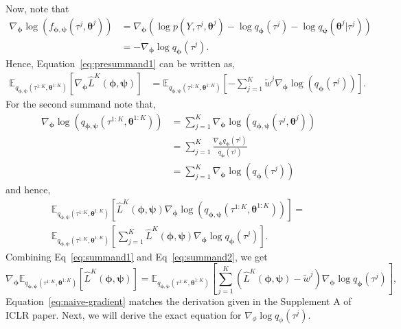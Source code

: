 \documentclass{article}
\newcommand{\bParam}{\bm{\theta}}
\newcommand{\E}{\mathbb{E}}
\begin{document}
Now, note that
\begin{align*}
    \nabla_{\bm{\phi}} \log(f_{\bm{\phi}, \bm{\psi}}(\tau^j, \bParam^j)) &= \nabla_{\bm{\phi}} (\log p(Y, \tau^j, \bParam^j) - \log q_{\bm{\phi}}(\tau^j) - \log q_{\bm{\psi}}(\bParam^j | \tau^j)) \\
    &= - \nabla_{\bm{\phi}} \log q_{\bm{\phi}}(\tau^j).
\end{align*}
Hence, Equation~\ref{eq:presummand1} can be written as,
\begin{align}\label{eq:summand1}
    \E_{q_{\bm{\phi}, \bm{\psi}}(\tau^{1:K}, \bParam^{1:K})}[\nabla_{\bm{\phi}} \hat{L}^K(\bm{\phi}, \bm{\psi})] &= \E_{q_{\bm{\phi}, \bm{\psi}}(\tau^{1:K}, \bParam^{1:K})}\left[- \sum_{j=1}^{K} \tilde{w}^j \nabla_{\bm{\phi}} \log(q_{\bm{\phi}}(\tau^j))\right].
\end{align}
For the second summand note that,
\begin{align*}
    \nabla_{\bm{\phi}} \log(q_{\bm{\phi}, \bm{\psi}}(\tau^{1:K}, \bParam^{1:K})) &= \sum\limits_{j=1}^{K} \nabla_{\bm{\phi}} \log(q_{\bm{\phi},\bm{\psi}}(\tau^{j}, \bParam^{j})) \\
    &= \sum\limits_{j=1}^{K} \frac{\nabla_{\bm{\phi}} q_{\bm{\phi}}(\tau^{j})}{q_{\bm{\phi}}(\tau^{j})} \\
    &= \sum\limits_{j=1}^{K} \nabla_{\bm{\phi}} \log(q_{\bm{\phi}}(\tau^{j}))
\end{align*}
and hence,
\begin{multline}\label{eq:summand2}
    \E_{q_{\bm{\phi}, \bm{\psi}}(\tau^{1:K}, \bParam^{1:K})}[\hat{L}^K(\bm{\phi}, \bm{\psi}) \nabla_{\bm{\phi}} \log(q_{\bm{\phi}, \bm{\psi}}(\tau^{1:K}, \bParam^{1:K}))] = \\
    \E_{q_{\bm{\phi}, \bm{\psi}}(\tau^{1:K},\bParam^{1:K})}\left[\sum\limits_{j=1}^{K} \hat{L}^K(\bm{\phi}, \bm{\psi}) \nabla_{\bm{\phi}} \log q_{\bm{\phi}}(\tau^{j})\right].
\end{multline}
Combining Eq~\ref{eq:summand1} and Eq~\ref{eq:summand2}, we get
\begin{equation}\label{eq:naive-gradient}
    \nabla_{\bm{\phi}} \E_{q_{\bm{\phi}, \bm{\psi}}(\tau^{1:K},\bParam^{1:K})}[\hat{L}^K(\bm{\phi}, \bm{\psi})] = \E_{q_{\bm{\phi}, \bm{\psi}}(\tau^{1:K},\bParam^{1:K})}\left[\sum\limits_{j=1}^{K} (\hat{L}^K(\bm{\phi}, \bm{\psi}) - \tilde{w}^j) \nabla_{\bm{\phi}} \log q_{\bm{\phi}}(\tau^j) \right],
\end{equation}
Equation~\ref{eq:naive-gradient} matches the derivation given in the Supplement A of ICLR paper.
Next, we will derive the exact equation for $\nabla_{\phi} \log q_{\phi}(\tau^j)$.
\end{document}
